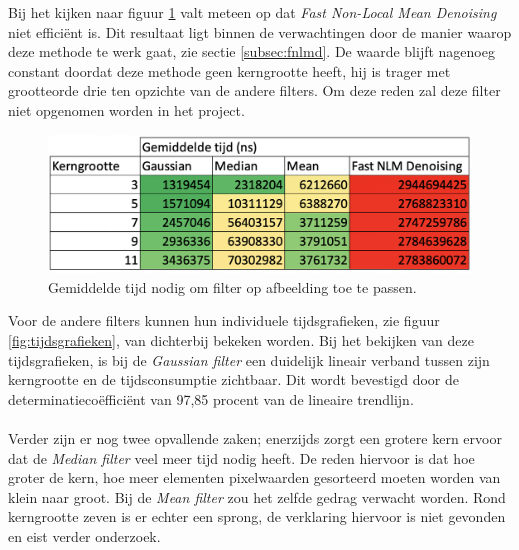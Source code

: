 Bij het kijken naar figuur \ref{fig:tijd} valt meteen op dat \textit{Fast Non-Local Mean Denoising} niet efficiënt is. Dit resultaat ligt binnen de verwachtingen door de manier waarop deze methode te werk gaat, zie sectie \ref{subsec:fnlmd}. De waarde blijft nagenoeg constant doordat deze methode geen kerngrootte heeft, hij is trager met grootteorde drie ten opzichte van de andere filters. Om deze reden zal deze filter niet opgenomen worden in het project. 

\begin{figure}[h!]
    \centering
    \includegraphics[width=\linewidth]{img/tijdsconsumptie}
    \caption{Gemiddelde tijd nodig om filter op afbeelding toe te passen.}
    \label{fig:tijd}
\end{figure}

Voor de andere filters kunnen hun individuele tijdsgrafieken, zie figuur \ref{fig:tijdsgrafieken}, van dichterbij bekeken worden. 
Bij het bekijken van deze tijdsgrafieken, is bij de \textit{Gaussian filter} een duidelijk lineair verband tussen zijn kerngrootte en de tijdsconsumptie zichtbaar. Dit wordt bevestigd door de determinatiecoëfficiënt van 97,85 procent van de lineaire trendlijn. 

\paragraph{}
Verder zijn er nog twee opvallende zaken; enerzijds zorgt een grotere kern ervoor dat de \textit{Median filter} veel meer tijd nodig heeft. De reden hiervoor is dat hoe groter de kern, hoe meer elementen pixelwaarden gesorteerd moeten worden van klein naar groot. Bij de {\it Mean filter} zou het zelfde gedrag verwacht worden. Rond kerngrootte zeven is er echter een sprong, de verklaring hiervoor is niet gevonden en eist verder onderzoek.

